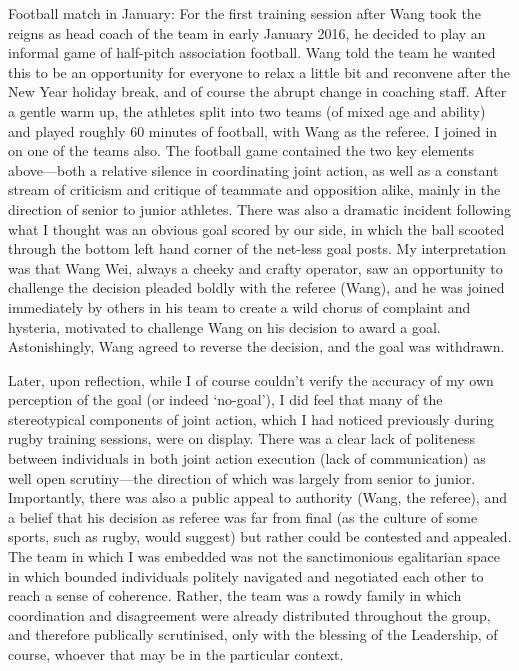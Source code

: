 \begin{CJK}{UTF8}{gbsn}
Football match in January:
  For the first training session after Wang took the reigns as head coach of the team in early January 2016, he decided to play an informal game of half-pitch association football.  Wang told the team he wanted this to be an opportunity for everyone to relax a little bit and reconvene after the New Year holiday break, and of course the abrupt change in coaching staff. After a gentle warm up, the athletes split into two teams (of mixed age and ability) and played roughly 60 minutes of football, with Wang as the referee.  I joined in on one of the teams also.  The football game contained the two key elements above---both a relative silence in coordinating joint action, as well as a constant stream of criticism and critique of teammate and opposition alike, mainly in the direction of senior to junior athletes.  There was also a dramatic incident following what I thought was an obvious goal scored by our side, in which the ball scooted through the bottom left hand corner of the net-less goal posts. My interpretation was that Wang Wei, always a cheeky and crafty operator, saw an opportunity to challenge the decision  pleaded boldly with the referee (Wang), and he was joined immediately by others in his team to create a wild chorus of complaint and hysteria, motivated to challenge Wang on his decision to award a goal.  Astonishingly, Wang agreed to reverse the decision, and the goal was withdrawn.

  Later, upon reflection, while I of course couldn't verify the accuracy of my own perception of the goal (or indeed `no-goal'), I did feel that many of the stereotypical components of joint action, which I had noticed previously during rugby training sessions, were on display.  There was a clear lack of politeness between individuals in both joint action execution (lack of communication) as well open scrutiny---the direction of which was largely from senior to junior.  Importantly, there was also a public appeal to authority (Wang, the referee), and a belief that his decision as referee was far from final (as the culture of some sports, such as rugby, would suggest) but rather could be contested and appealed.  The team in which I was embedded was not the sanctimonious egalitarian space in which bounded individuals politely navigated and negotiated each other to reach a sense of coherence.  Rather, the team was a rowdy family in which coordination and disagreement were already distributed throughout the group, and therefore publically scrutinised, only with the blessing of the Leadership, of course, whoever that may be in the particular context.








\end{CJK}
